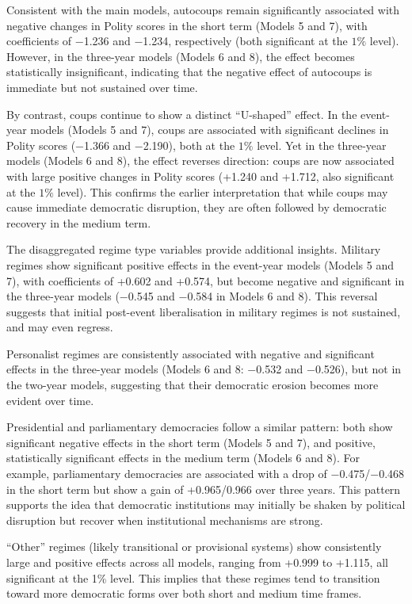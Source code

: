 \documentclass[
  12pt,
]{report}
\begin{document}
Consistent with the main models, autocoups remain significantly
associated with negative changes in Polity scores in the short term
(Models 5 and 7), with coefficients of −1.236 and −1.234, respectively
(both significant at the \(1\%\) level). However, in the three-year
models (Models 6 and 8), the effect becomes statistically insignificant,
indicating that the negative effect of autocoups is immediate but not
sustained over time.

By contrast, coups continue to show a distinct ``U-shaped'' effect. In
the event-year models (Models 5 and 7), coups are associated with
significant declines in Polity scores (−1.366 and −2.190), both at the
\(1\%\) level. Yet in the three-year models (Models 6 and 8), the effect
reverses direction: coups are now associated with large positive changes
in Polity scores (+1.240 and +1.712, also significant at the \(1\%\)
level). This confirms the earlier interpretation that while coups may
cause immediate democratic disruption, they are often followed by
democratic recovery in the medium term.

The disaggregated regime type variables provide additional insights.
Military regimes show significant positive effects in the event-year
models (Models 5 and 7), with coefficients of +0.602 and +0.574, but
become negative and significant in the three-year models (−0.545 and
−0.584 in Models 6 and 8). This reversal suggests that initial
post-event liberalisation in military regimes is not sustained, and may
even regress.

Personalist regimes are consistently associated with negative and
significant effects in the three-year models (Models 6 and 8: −0.532 and
−0.526), but not in the two-year models, suggesting that their
democratic erosion becomes more evident over time.

Presidential and parliamentary democracies follow a similar pattern:
both show significant negative effects in the short term (Models 5 and
7), and positive, statistically significant effects in the medium term
(Models 6 and 8). For example, parliamentary democracies are associated
with a drop of −0.475/−0.468 in the short term but show a gain of
+0.965/0.966 over three years. This pattern supports the idea that
democratic institutions may initially be shaken by political disruption
but recover when institutional mechanisms are strong.

``Other'' regimes (likely transitional or provisional systems) show
consistently large and positive effects across all models, ranging from
+0.999 to +1.115, all significant at the 1\% level. This implies that
these regimes tend to transition toward more democratic forms over both
short and medium time frames.
\end{document}
